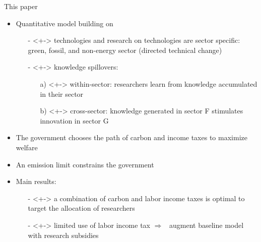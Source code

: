 \documentclass[11pt,aspectratio=169]{beamer}
\newcommand{\ar}{$\Rightarrow$ \ }
\begin{document}
\begin{frame}{This paper}
	\vspace{-2mm}
	\begin{itemize}
		\item<+-> Quantitative model building on \cite{Fried2018ClimateAnalysis} 
		\vspace{2mm}
		\begin{itemize}
			\item[-]<+-> \alert{technologies and research on technologies are sector specific}: green, fossil, and non-energy sector \footnotesize{(directed technical change) }
			\vspace{1mm}
			\item[-]<+-> \alert{knowledge spillovers}: 
			\begin{enumerate}
				\item[a)]<+-> \alert{within-sector}: researchers learn from knowledge accumulated in their sector
				\item[b)]<+-> \alert{cross-sector}: knowledge generated in sector F stimulates innovation in sector G
			\end{enumerate}%
		\end{itemize}
		\vspace{2mm}
		\item<+->   The government   chooses the \alert{path of carbon and income taxes} to maximize welfare\vspace{2mm}
		\item<+-> An \alert{emission limit} constrains the government		\vspace{2mm}
		\item<+-> \alert{Main results:} 
		\begin{itemize}
			\item[-]<+-> a combination of carbon and labor income taxes is optimal to target the allocation of researchers 	\vspace{1mm} 
			\item[-]<+-> limited use of labor income tax \ar augment baseline model with research subsidies
		\end{itemize}
	\end{itemize}


\end{frame}
\end{document}
